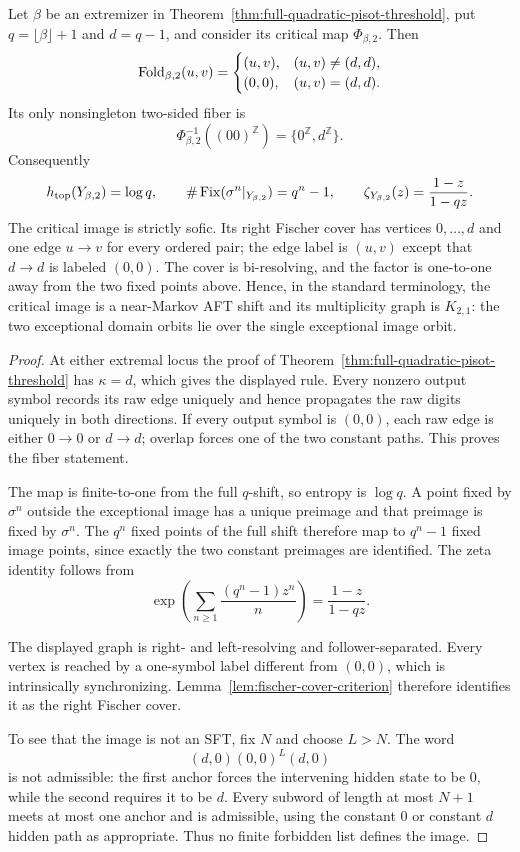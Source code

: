 \begin{theorem}
\label{thm:quadratic-critical-normal-form}
Let $\beta$ be an extremizer in
Theorem~\ref{thm:full-quadratic-pisot-threshold}, put
$q=\lfloor\beta\rfloor+1$ and $d=q-1$, and consider its critical map
$\Phi_{\beta,2}$.  Then
\[
\mathrm{Fold}_{\beta,2}(u,v)=
\begin{cases}
(u,v),&(u,v)\ne(d,d),\\
(0,0),&(u,v)=(d,d).
\end{cases}
\]
Its only nonsingleton two-sided fiber is
\[
\Phi_{\beta,2}^{-1}((00)^{\mathbb Z})
=\{0^{\mathbb Z},d^{\mathbb Z}\}.
\]
Consequently
\[
h_{\rm top}(Y_{\beta,2})=\log q,
\qquad
\#\operatorname{Fix}(\sigma^n|_{Y_{\beta,2}})=q^n-1,
\qquad
\zeta_{Y_{\beta,2}}(z)=\frac{1-z}{1-qz}.
\]
The critical image is strictly sofic.  Its right Fischer cover has vertices
$0,\ldots,d$ and one edge $u\to v$ for every ordered pair; the edge label is
$(u,v)$ except that $d\to d$ is labeled $(0,0)$.  The cover is bi-resolving,
and the factor is one-to-one away from the two fixed points above.  Hence, in
the standard terminology, the critical image is a near-Markov AFT shift and
its multiplicity graph is $K_{2,1}$: the two exceptional domain orbits lie
over the single exceptional image orbit.
\end{theorem}

\begin{proof}
At either extremal locus the proof of
Theorem~\ref{thm:full-quadratic-pisot-threshold} has $\kappa=d$, which gives
the displayed rule.  Every nonzero output symbol records its raw edge
uniquely and hence propagates the raw digits uniquely in both directions.
If every output symbol is $(0,0)$, each raw edge is either $0\to0$ or
$d\to d$; overlap forces one of the two constant paths.  This proves the
fiber statement.

The map is finite-to-one from the full $q$-shift, so entropy is $\log q$.
A point fixed by $\sigma^n$ outside the exceptional image has a unique
preimage and that preimage is fixed by $\sigma^n$.  The $q^n$ fixed points
of the full shift therefore map to $q^n-1$ fixed image points, since exactly
the two constant preimages are identified.  The zeta identity follows from
\[
\exp\left(\sum_{n\ge1}\frac{(q^n-1)z^n}{n}\right)
=\frac{1-z}{1-qz}.
\]

The displayed graph is right- and left-resolving and follower-separated.
Every vertex is reached by a one-symbol label different from $(0,0)$, which
is intrinsically synchronizing.  Lemma~\ref{lem:fischer-cover-criterion}
therefore identifies it as the right Fischer cover.

To see that the image is not an SFT, fix $N$ and choose $L>N$.  The word
\[
(d,0)(0,0)^L(d,0)
\]
is not admissible: the first anchor forces the intervening hidden state to be
$0$, while the second requires it to be $d$.  Every subword of length at
most $N+1$ meets at most one anchor and is admissible, using the constant
$0$ or constant $d$ hidden path as appropriate.  Thus no finite forbidden
list defines the image.
\end{proof}

